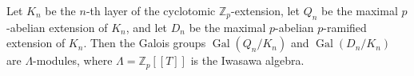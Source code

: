 Let $K_n$ be the $n$-th layer of the cyclotomic $\mathbb{Z}_p$-extension, let $Q_n$ be the maximal $p$-abelian extension of $K_n$, and let $D_n$ be the maximal $p$-abelian $p$-ramified extension of $K_n$. Then the Galois groups $\operatorname{Gal}(Q_n/K_n)$ and $\operatorname{Gal}(D_n/K_n)$ are $\Lambda$-modules, where $\Lambda = \mathbb{Z}_p[[T]]$ is the Iwasawa algebra.
